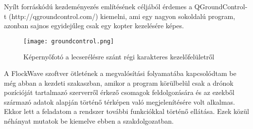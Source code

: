 Nyílt forráskódú kezdeményezés említésének céljából érdemes a QGroundControl-t
(http://qgroundcontrol.com/) kiemelni, ami egy nagyon sokoldalú program,
azonban sajnos egyidejűleg csak egy kopter kezelésére képes.

\begin{figure}[H]
  \texttt{[image: groundcontrol.png]}
  \caption{Képernyőfotó a lecserélésre szánt régi karakteres kezelőfelületről}
  \label{fig:groundcontrol}
\end{figure}

\noindent A FlockWave szoftver ötletének a megvalósítási folyamatába
kapcsolódtam be még abban a kezdeti szakaszban, amikor a program körülbelül csak
a drónok pozícióját tartalmazó szerverről érkező csomagok feldolgozására és az
ezekből származó adatok alapján történő térképen való megjelenítésére volt
alkalmas. Ekkor lett a feladatom a rendszer további funkciókkal történő
ellátása. Ezek közül néhányat mutatok be kiemelve ebben a szakdolgozatban.
